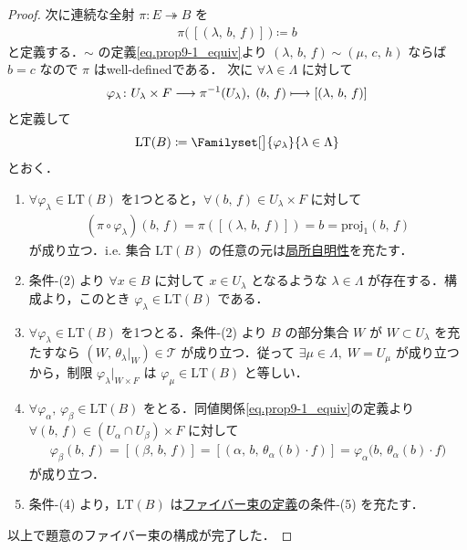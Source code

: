 \documentclass[algtopo_main]{subfiles}
\begin{document}
\begin{proof}
	次に連続な全射 $\pi \colon E \twoheadrightarrow B$ を
	\begin{align}
		\pi \bigl(\, [(\lambda,\, b,\, f)]\, \bigr) \coloneqq b
	\end{align}
	と定義する．$\sim$ の定義\eqref{eq.prop9-1_equiv}より $(\lambda,\, b,\, f) \sim (\mu,\, c,\, h)$ ならば $b=c$ なので $\pi$ はwell-definedである．
    次に $\forall \lambda \in \Lambda$ に対して%
	\begin{align}
		\varphi_\lambda \colon U_\lambda \times F \longrightarrow \pi^{-1}(U_\lambda),\; (b,\, f) \longmapsto [(\lambda,\, b,\, f)]
	\end{align}
	と定義して
    \begin{align}
        \mathrm{LT}(B) \coloneqq \Familyset[\big]{\varphi_\lambda}{\lambda \in \Lambda}
    \end{align}
    とおく．
    \begin{enumerate}
        \item $\forall \varphi_\lambda \in \mathrm{LT}(B)$ を1つとると，$\forall (b,\, f) \in U_\lambda \times F$ に対して
        \begin{align}
            (\pi \circ \varphi_\lambda)(b,\, f) = \pi([(\lambda,\, b,\, f)]) = b = \mathrm{proj}_1(b,\, f)
        \end{align}
        が成り立つ．i.e. 集合 $\mathrm{LT}(B)$ の任意の元は\hyperref[cmtd:FB-LT]{局所自明性}を充たす．
        \item 条件-(2) より $\forall x \in B$ に対して $x \in U_\lambda$ となるような $\lambda \in \Lambda$ が存在する．構成より，このとき $\varphi_\lambda \in \mathrm{LT}(B)$ である．
        \item $\forall \varphi_\lambda \in \mathrm{LT}(B)$ を1つとる．条件-(2) より $B$ の部分集合 $W$ が $W \subset U_\lambda$ を充たすなら $(W,\, \theta_\lambda|_W) \in \mathcal{T}$ が成り立つ．従って $\exists \mu \in \Lambda,\; W = U_\mu$ が成り立つから，制限 $\varphi_\lambda|_{W \times F}$ は $\varphi_\mu \in \mathrm{LT}(B)$ と等しい．
        \item $\forall \varphi_\alpha,\, \varphi_\beta \in \mathrm{LT}(B)$ をとる．同値関係\eqref{eq.prop9-1_equiv}の定義より $\forall (b,\, f) \in (U_\alpha \cap U_\beta) \times F$ に対して
        \begin{align}
            \varphi_\beta (b,\, f) = [(\beta,\, b,\, f)] = [(\alpha,\, b,\, \theta_\alpha(b) \cdot f)] = \varphi_\alpha \bigl( b,\, \theta_\alpha(b) \cdot f \bigr) 
        \end{align}
        が成り立つ．
        \item 条件-(4) より，$\mathrm{LT}(B)$ は\hyperref[def:FB]{ファイバー束の定義}の条件-(5) を充たす．
    \end{enumerate}
    以上で題意のファイバー束の構成が完了した．
\end{proof}
\end{document}
